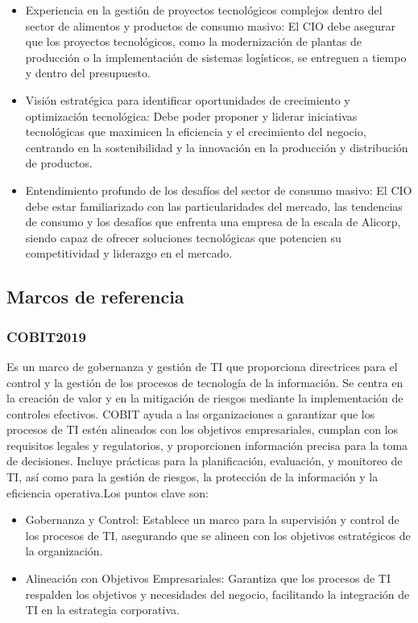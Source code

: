 \begin{itemize}
            \item Experiencia en la gestión de proyectos tecnológicos complejos dentro del sector de alimentos y productos de consumo masivo: El CIO debe asegurar que los proyectos tecnológicos, como la modernización de plantas de producción o la implementación de sistemas logísticos, se entreguen a tiempo y dentro del presupuesto. 
            \item Visión estratégica para identificar oportunidades de crecimiento y optimización tecnológica: Debe poder proponer y liderar iniciativas tecnológicas que maximicen la eficiencia y el crecimiento del negocio, centrando en la sostenibilidad y la innovación en la producción y distribución de productos. 
            \item Entendimiento profundo de los desafíos del sector de consumo masivo: El CIO debe estar familiarizado con las particularidades del mercado, las tendencias de consumo y los desafíos que enfrenta una empresa de la escala de Alicorp, siendo capaz de ofrecer soluciones tecnológicas que potencien su competitividad y liderazgo en el mercado. 
        \end{itemize}

\subsection{Marcos de referencia}

    \subsubsection{COBIT2019}

    Es un marco de gobernanza y gestión de TI que proporciona directrices para el control y la gestión de los procesos de tecnología de la información. Se centra en la creación de valor y en la mitigación de riesgos mediante la implementación de controles efectivos. COBIT ayuda a las organizaciones a garantizar que los procesos de TI estén alineados con los objetivos empresariales, cumplan con los requisitos legales y regulatorios, y proporcionen información precisa para la toma de decisiones. Incluye prácticas para la planificación, evaluación, y monitoreo de TI, así como para la gestión de riesgos, la protección de la información y la eficiencia operativa.Los puntos clave son:
        \begin{itemize}
            \item Gobernanza y Control: Establece un marco para la supervisión y control de los procesos de TI, asegurando que se alineen con los objetivos estratégicos de la organización.
            \item Alineación con Objetivos Empresariales: Garantiza que los procesos de TI respalden los objetivos y necesidades del negocio, facilitando la integración de TI en la estrategia corporativa.
        \end{itemize}

